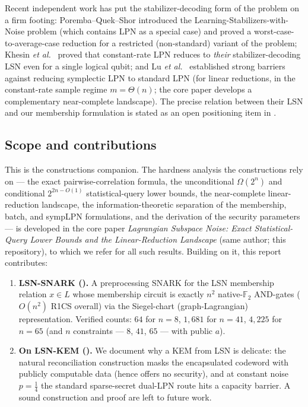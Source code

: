 \documentclass[11pt,a4paper]{article}
\theoremstyle{plain}
\theoremstyle{definition}
\newcommand{\F}{\mathbb{F}}
\newcommand{\etal}{\textit{et al.}}
\begin{document}
Recent independent work has put the stabilizer-decoding form of the problem on a firm footing: Poremba--Quek--Shor \cite{PQS26} introduced the Learning-Stabilizers-with-Noise problem (which contains LPN as a special case) and proved a worst-case-to-average-case reduction for a restricted (non-standard) variant of the problem; Khesin \etal\ \cite{KLP+25} proved that constant-rate LPN reduces to \emph{their} stabilizer-decoding LSN even for a single logical qubit; and Lu \etal\ \cite{LPQR26} established strong barriers against reducing symplectic LPN to standard LPN (for linear reductions, in the constant-rate sample regime $m=\Theta(n)$; the core paper develops a complementary near-complete landscape). The precise relation between their LSN and our membership formulation is stated as an open positioning item in .

\subsection{Scope and contributions}
\label{subsec:contributions}

This is the constructions companion. The hardness analysis the constructions rely on --- the exact pairwise-correlation formula, the unconditional $\Omega(2^n)$ and conditional $2^{2n-O(1)}$ statistical-query lower bounds, the near-complete linear-reduction landscape, the information-theoretic separation of the membership, batch, and sympLPN formulations, and the derivation of the security parameters --- is developed in the core paper \emph{Lagrangian Subspace Noise: Exact Statistical-Query Lower Bounds and the Linear-Reduction Landscape} (same author; this repository), to which we refer for all such results. Building on it, this report contributes:

\begin{enumerate}
    \item \textbf{LSN-SNARK ().} A preprocessing SNARK for the LSN membership relation $x \in L$ whose membership circuit is exactly $n^2$ native-$\F_2$ AND-gates ($O(n^2)$ R1CS overall) via the Siegel-chart (graph-Lagrangian) representation. Verified counts: $64$ for $n=8$, $1{,}681$ for $n=41$, $4{,}225$ for $n=65$ (and $n$ constraints --- $8$, $41$, $65$ --- with public $a$).
    \item \textbf{On LSN-KEM ().} We document why a KEM from LSN is delicate: the natural reconciliation construction masks the encapsulated codeword with publicly computable data (hence offers no security), and at constant noise $p=\tfrac14$ the standard sparse-secret dual-LPN route hits a capacity barrier. A sound construction and proof are left to future work.
\end{enumerate}
\end{document}
